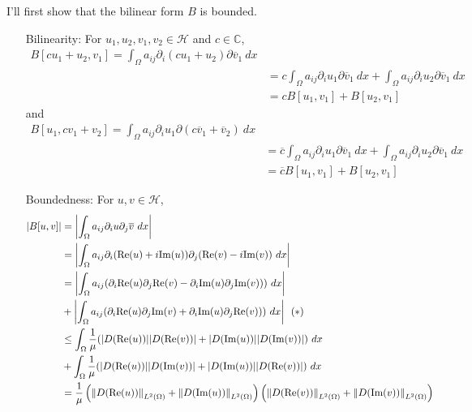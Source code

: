 \documentclass{article}
\begin{document}
\begin{enumerate}
I'll first show that the bilinear form $B$ is bounded.
\begin{enumerate}
\item[Bilinearity:] For $u_1,u_2,v_1,v_2\in \mathcal{H}$ and $c\in \mathbb{C}$,
\begin{equation*}
\begin{split}
B[cu_1+u_2,v_1]=\int_\Omega a_{ij}\partial_i (cu_1+u_2)\partial \overline{v}_1~dx \\
&=c\int_\Omega a_{ij}\partial_i u_1\partial \overline{v}_1~dx+\int_\Omega a_{ij}\partial_i u_2\partial \overline{v}_1~dx \\
&=cB[u_1,v_1]+B[u_2,v_1]
\end{split}
\end{equation*}
and
\begin{equation*}
\begin{split}
B[u_1,cv_1+v_2]=\int_\Omega a_{ij}\partial_i u_1\partial (c\overline{v}_1+\overline{v}_2)~dx \\
&=\overline{c}\int_\Omega a_{ij}\partial_i u_1\partial \overline{v}_1~dx+\int_\Omega a_{ij}\partial_i u_2\partial \overline{v}_1~dx \\
&=\overline{c}B[u_1,v_1]+B[u_2,v_1]
\end{split}
\end{equation*}
\item[Boundedness:]  For $u,v\in \mathcal{H}$,
\begin{equation*}
\begin{split}
\abs{B[u,v]}&=\abs{\int_\Omega a_{ij}\partial_i u\partial_j \overline{v}~dx} \\
&=\abs{\int_\Omega a_{ij}\partial_i (\text{Re}(u)+i\text{Im}(u))\partial_j (\text{Re}(v)-i\text{Im}(v))~dx} \\
&=\abs{\int_\Omega a_{ij} (\partial_i\text{Re}(u)\partial_j\text{Re}(v)-\partial_i\text{Im}(u)\partial_j\text{Im}(v)))~dx}\\
&+\abs{\int_\Omega a_{ij} (\partial_i\text{Re}(u)\partial_j\text{Im}(v)+\partial_i\text{Im}(u)\partial_j\text{Re}(v)))~dx}~~(*)\\
&\leq\int_\Omega \frac{1}{\mu} (\abs{D(\text{Re}(u))}\abs{D(\text{Re}(v))}+\abs{D(\text{Im}(u))}\abs{D(\text{Im}(v))})~dx\\
&+\int_\Omega \frac{1}{\mu} (\abs{D(\text{Re}(u))}\abs{D(\text{Im}(v))}+\abs{D(\text{Im}(u))}\abs{D(\text{Re}(v))})~dx\\
&=\frac{1}{\mu}\left(\norm{D(\text{Re}(u))}_{L^2(\Omega)}+\norm{D(\text{Im}(u))}_{L^2(\Omega)}\right)\left(\norm{D(\text{Re}(v))}_{L^2(\Omega)}+\norm{D(\text{Im}(v))}_{L^2(\Omega)}\right) \\

\end{split}
\end{equation*}
\end{enumerate}
\end{enumerate}
\end{document}

